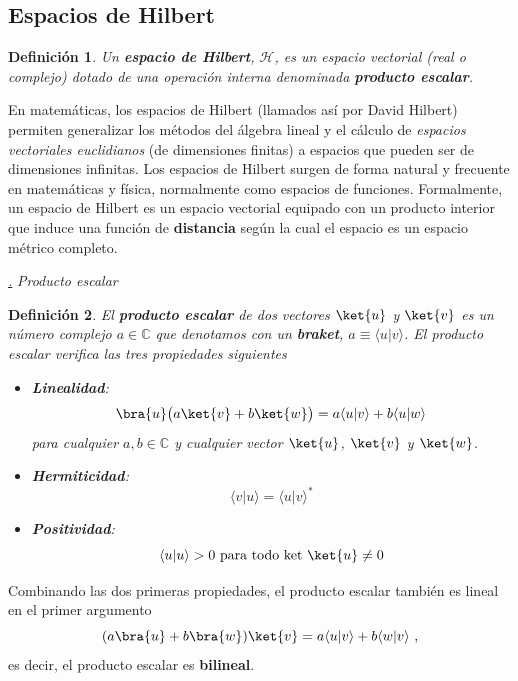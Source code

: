 \documentclass[a4paper,11pt]{book} %
\newtheorem{definicion_contador}{Definición}
\newcommand{\Definicion}[1]{
		\begin{mybox_gray2}{}
			\begin{definicion_contador}
				 #1 
			\end{definicion_contador} 
		\end{mybox_gray2}
	}
\numberwithin{equation}{chapter}
\newcommand{\braket}[2]{\langle #1|#2\rangle}
\def\subsubiContadorIt{\par\addtocounter{subsubsection}{1}\underline{\it\thesubsubsection.}\hskip0.5cm \setcounter{subsubsubsectionIt}{0}}
\newcommand{\SubsubiIt}[1]{
		\subsubiContadorIt \textit{#1}
	}
\newcounter{subsubsubsectionIt}[subsubsection]
\begin{document}
		\subsection{Espacios de Hilbert}

	\Definicion{
	Un \textbf{espacio de Hilbert}, $\mathcal{H}$, es un espacio vectorial (real o complejo) dotado de una operación interna denominada \textbf{producto escalar}.
	}

En matemáticas, los espacios de Hilbert (llamados así por David Hilbert) permiten generalizar los métodos del álgebra lineal y el cálculo de \textit{espacios vectoriales euclidianos} (de dimensiones finitas) a espacios que pueden ser de dimensiones infinitas. Los espacios de Hilbert surgen de forma natural y frecuente en matemáticas y física, normalmente como espacios de funciones. Formalmente, un espacio de Hilbert es un espacio vectorial equipado con un producto interior que induce una función de \textbf{distancia} según la cual el espacio es un espacio métrico completo.

			\SubsubiIt{Producto escalar}
			
	\Definicion{
	El \textbf{producto escalar} de dos vectores $\ket{u}$ y $\ket{v}$ es un \textit{número complejo} $a\in{\mathbb C}$ que denotamos con un \textbf{braket}, $a \equiv \braket{u}{v} $. El producto escalar verifica las tres propiedades siguientes
	\begin{itemize}
	\item \textbf{Linealidad}: 
		\begin{equation}
		\bra{u}\big(a\ket{v}+b\ket{w}\big) = a\braket{u}{v} + b\braket{u}{w}
		\end{equation}	
		para cualquier $a,b \in  \mathbb{C}$ y cualquier vector $\ket{u}$, $\ket{v}$ y $\ket{w}$.
		
	\item \textbf{Hermiticidad}: 
		\begin{equation}
		\braket{v}{u} = \braket{u}{v}^*
		\end{equation}
	\item \textbf{Positividad}: 
		\begin{equation}
		\braket{u}{u} >0 \text{ para todo ket } \ket{u}\neq 0
		\end{equation}	
	\end{itemize}
	}
Combinando las dos primeras propiedades, el producto escalar también es lineal en el primer argumento
$$
(a\bra{u}+b\bra{w})\ket{v} = a\braket{u}{v} + b\braket{w}{v}~,
$$
es decir, el producto escalar es \textbf{bilineal}.
\end{document}
